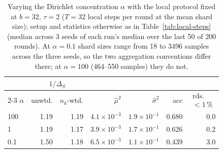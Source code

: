 \begin{table}[t]
  \centering
  \caption{Varying the Dirichlet concentration $\alpha$ with the local protocol fixed at $b=32$, $\tau=2$ ($T=32$ local steps per round at the mean shard size); setup and statistics otherwise as in Table~\ref{tab:local-steps} (median across 3 seeds of each run's median over the last 50 of 200 rounds). At $\alpha=0.1$ shard sizes range from 18 to 3496 samples across the three seeds, so the two aggregation conventions differ there; at $\alpha=100$ (464--550 samples) they do not.}
  \label{tab:alpha}
  \footnotesize
  \setlength{\tabcolsep}{2.5pt}
  \begin{tabular}{@{}lrrrrrr@{}}
    \toprule
    & \multicolumn{2}{c}{$1/\Delta_S$} & & & & \\
    \cmidrule(lr){2-3}
    $\alpha$ & unwtd. & $n_k$-wtd. & $\hat{\mu}^2$ & $\hat{\sigma}^2$ & acc & $\substack{\text{rds.}\\<1\,\%}$ \\
    \midrule
    100 & 1.19 & 1.19 & $4.1\times10^{-3}$ & $1.9\times10^{-1}$ & 0.680 & 0.0 \\
    1 & 1.19 & 1.17 & $3.9\times10^{-3}$ & $1.7\times10^{-1}$ & 0.626 & 0.2 \\
    0.1 & 1.50 & 1.18 & $6.5\times10^{-3}$ & $1.1\times10^{-1}$ & 0.439 & 3.0 \\
    \bottomrule
  \end{tabular}
\end{table}
